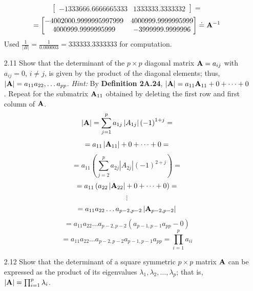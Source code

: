 \begin{enumerate}[font=\bfseries]
\[\begin{bmatrix}
                -1333666.6666665333 & 1333333.3333332
            \end{bmatrix}
            =
        \]
        \[
            =
            \begin{bmatrix}
                -4002000.9999995997999 & 4000999.9999995999 \\
                4000999.9999995999 & -3999999.9999996
            \end{bmatrix}
            \doteq
            \bold{A}^{-1}
        \]
        Used $\frac{1}{\left|B\right|}=\frac{1}{0.000003}=333333.3333333$ for computation.
        \item[2.11] Show that the determinant of the $p \times p$ diagonal matrix $\bold{A}= {a_{ij}}$ with $a_{ij} = 0$, $i \ne j$,
        is given by the product of the diagonal elements; thus, $\left|\bold{A}\right| = a_{11} a_{22}, \dots a_{pp}$.
        \newline
        \textit{Hint:} By \textbf{Definition 2A.24}, $\left|\bold{A}\right| = a_{11} \bold{A}_{11} + 0 + \dots + 0$. Repeat for the submatrix
        $\bold{A}_{11}$ obtained by deleting the first row and first column of $\bold{A}$.
        \[
            \left|\bold{A}\right| = \sum_{j=1}^p{a_{1j}\left|A_{1j}\right|{\left(-1\right)}^{1+j}} =
        \]
        \[
            = a_{11}\left|\bold{A}_{11}\right| + 0 + \dots + 0 =
        \]
        \[
            = a_{11}\left(\sum_{j=2}^p{a_{2j}\left|A_{2j}\right|{\left(-1\right)}^{2+j}}\right) =
        \]
        \[
            = a_{11}\left(a_{22}\left|\bold{A}_{22}\right| + 0 + \dots + 0\right) =
        \]
        \[
            \vdots
        \]
        \[
            = a_{11}a_{22}\dots a_{p-2, p-2}\left|\bold{A}_{p-2, p-2}\right|
        \]
        \[
            = a_{11}a_{22}\dots a_{p-2, p-2}\left(a_{p-1, p-1}a_{pp} - 0\right)
        \]
        \[
            = a_{11}a_{22}\dots a_{p-2, p-2}a_{p-1, p-1}a_{pp} = \prod_{i=1}^p{a_{ii}}
        \]
        \item[2.12] Show that the determinant of a square symmetric $p \times p$ matrix $\bold{A}$ can be expressed as
        the product of its eigenvalues $\lambda_1 , \lambda_2, \dots , \lambda_p$; that is, $\left|\bold{A}\right| = \prod_{i=1}^p{\lambda_i}$.

\end{enumerate}
